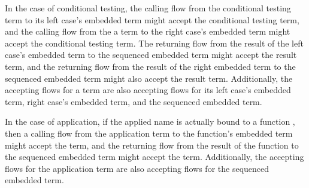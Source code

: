 \documentclass[letterpaper, 11pt]{extarticle}
\begin{document}
In the case of conditional testing, the calling flow from the conditional testing term to
its left case's embedded term might accept the conditional testing term, and
the calling flow from the a term to
the right case's embedded term might accept the conditional testing term.
The returning flow from the result of the
left case's embedded term to the sequenced embedded term might accept the result term,
and the returning flow from the result of the right embedded term to the sequenced embedded term
might also accept the result term. Additionally, the accepting flows for a term are also
accepting flows for its left case's embedded term, right case's embedded term,
and the sequenced embedded term.  

In the case of application, if the applied name is actually bound to a function
, then a calling flow from the application term to the function's embedded term
might accept the term, and the returning flow from the result of the function
 to the sequenced embedded term might accept the term.
Additionally, the accepting flows for the application term are also
accepting flows for the sequenced embedded term. 
\end{document}
